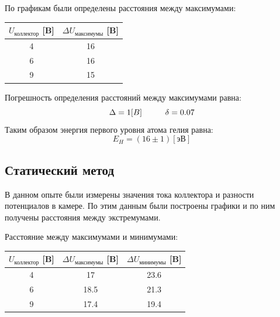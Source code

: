 \documentclass[a4paper,12pt]{article} %
\begin{document}
			По графикам были определены расстояния между максимумами:
			\begin{table}[h!]
				\centering
				\begin{tabular}{|c|c|}
				\hline
				$U_\text{коллектор}$ [B] & $\Delta U_\text{максимумы}$ [B]      \\ \hline
				4                        & 16                                   \\ \hline
				6                        & 16                                   \\ \hline
				9                        & 15                                   \\ \hline
				\end{tabular}
			\end{table}
			Погрешность определения расстояний между максимумами равна:
			\begin{equation}
				\Delta = 1 [B] \hspace{10mm}
				\delta = 0.07
			\end{equation}
			Таким образом энергия первого уровня атома гелия равна:
			\begin{equation}
				E_H = (16 \pm 1) [\text{эВ}]
			\end{equation}

		\subsection{Статический метод}
				
			В данном опыте были измерены значения тока коллектора и разности потенциалов в камере.
			По этим данным были построены графики и по ним получены расстояния между экстремумами.\par
			Расстояние между максимумами и минимумами:
			\begin{table}[h!]
				\centering
				\begin{tabular}{|c|c|c|}
				\hline
				$U_\text{коллектор}$ [B] & $\Delta U_\text{максимумы}$ [B]  & $\Delta U_\text{минимумы}$ [B]\\ \hline
				4                        & 17                           	& 23.6                      	\\ \hline
				6                        & 18.5                         	& 21.3                      	\\ \hline
				9                        & 17.4                         	& 19.4                      	\\ \hline
				\end{tabular}
			\end{table}\par
\end{document}
